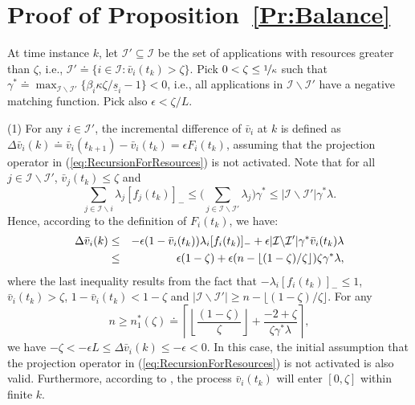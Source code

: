\documentclass[letter,11pt]{article}
\begin{document}
\section{Proof of Proposition~\ref{Pr:Balance}} \label{Ap:Balance}

At time instance $k$, let $\mathcal{I}'\subseteq{\mathcal{I}}$ be the set of applications with resources greater than $\zeta$, i.e., $\mathcal{I}'{\doteq} \{i\in\mathcal{I}:{\bar{v}}_i(t_k) > \zeta\}$. Pick $0<\zeta\leq\nicefrac{1}{\kappa}$ such that $\gamma^*{\doteq}\max_{\mathcal{I}\backslash\mathcal{I}'}\{\beta_i\kappa\zeta/\underline{s}_i-1\}<0$, i.e., all applications in $\mathcal{I}\backslash\mathcal{I}'$ have a negative matching function. Pick also $\epsilon<\zeta/L$.

(1) For any $i\in\mathcal{I}'$, the incremental difference of ${\bar{v}}_i$ at $k$ is defined as $\Delta{{\bar{v}}_i}(k){\doteq} {\bar{v}}_i(t_{k+1}) - {\bar{v}}_i(t_{k}) = \epsilon F_i(t_k)$, assuming that the projection operator in (\ref{eq:RecursionForResources}) is not activated.
Note that for all $j\in\mathcal{I}\backslash\mathcal{I}'$, ${\bar{v}}_j(t_k) \leq \zeta$ and
$$\sum_{j\in\mathcal{I}\backslash{i}}\lambda_j{[{f_j(t_k)}]_{-}} \leq \Big(\sum_{j\in\mathcal{I}\backslash\mathcal{I}'}\lambda_j\Big)\gamma^* \leq {\left\vert {\mathcal{I}\backslash\mathcal{I}'} \right\vert}\gamma^*\lambda.$$
Hence, according to the definition of $F_i(t_k)$, we have:
\begin{eqnarray*}
\Delta{{\bar{v}}_i}(k) & \leq & -\epsilon(1-{\bar{v}}_i(t_k))\lambda_i{[{f_i(t_k)}]_{-}} +   \epsilon{\left\vert {\mathcal{I}\backslash\mathcal{I}'} \right\vert}\gamma^* {\bar{v}}_i(t_k)\lambda \cr
&\leq&  \epsilon(1-\zeta) + \epsilon
(n - \left\lfloor{(1-\zeta)/\zeta}\right\rfloor)\zeta\gamma^*\lambda,
\end{eqnarray*}
where the last inequality results from the fact that $-\lambda_i{[{f_i(t_k)}]_{-}} \leq 1$, ${\bar{v}}_i(t_k)>\zeta$, $1-{\bar{v}}_i(t_k) < 1-\zeta$ and 
${\left\vert {\mathcal{I}\backslash\mathcal{I}'} \right\vert}\geq n - \lfloor{(1-\zeta)/\zeta}\rfloor$. For any $$n\geq n_1^*(\zeta) {\doteq} \left\lceil{\left\lfloor{\frac{(1-\zeta)}{\zeta}}\right\rfloor + \frac{-2+\zeta}{\zeta\gamma^*\lambda}}\right\rceil,$$ we have $-\zeta< -\epsilon{L}\leq\Delta{{\bar{v}}_i}(k)\leq -\epsilon < 0.$ In this case, the initial assumption that the projection operator in (\ref{eq:RecursionForResources}) is not activated is also valid. Furthermore, according to \cite[Theorem~5.1]{Nevelson76}, the process ${\bar{v}}_i(t_{k})$ will enter $[0,\zeta]$ within finite $k$. 
\end{document}
